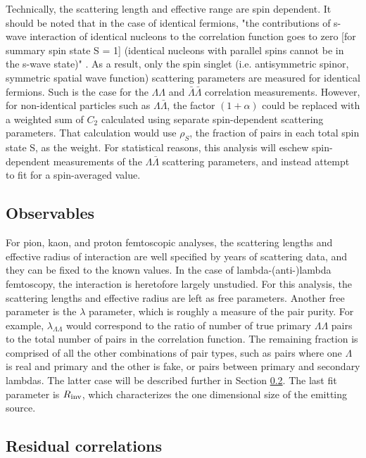 Technically, the scattering length and effective range are spin dependent.  It should be noted that in the case of identical fermions, "the contributions of s-wave interaction of identical nucleons to the correlation function goes to zero [for summary spin state S = 1] (identical nucleons with parallel spins cannot be in the s-wave state)" \cite{lednicky82}.  As a result, only the spin singlet (i.e. antisymmetric spinor, symmetric spatial wave function) scattering parameters are measured for identical fermions.  Such is the case for the $\Lambda\Lambda$ and $\bar{\Lambda}\bar{\Lambda}$ correlation measurements.  However, for non-identical particles such as $\Lambda\bar{\Lambda}$, the factor $(1+\alpha)$ could be replaced with a weighted sum of $C_2$ calculated using separate spin-dependent scattering parameters.  That calculation would use $\rho_S$, the fraction of pairs in each total spin state S, as the weight.  For statistical reasons, this analysis will eschew spin-dependent measurements of the $\Lambda\bar{\Lambda}$ scattering parameters, and instead attempt to fit for a spin-averaged value.


\subsection{Observables}
\label{sec:Observables}
For pion, kaon, and proton femtoscopic analyses, the scattering lengths and effective radius of interaction are well specified by years of scattering data, and they can be fixed to the known values.  In the case of lambda-(anti-)lambda femtoscopy, the interaction is heretofore largely unstudied.  For this analysis, the scattering lengths and effective radius are left as free parameters.  Another free parameter is the $\lambda$ parameter, which is roughly a measure of the pair purity.  For example, $\lambda_{\Lambda\Lambda}$ would correspond to the ratio of number of true primary $\Lambda\Lambda$ pairs to the total number of pairs in the correlation function. The remaining fraction is comprised of all the other combinations of pair types, such as pairs where one $\Lambda$ is real and primary and the other is fake, or pairs between primary and secondary lambdas.  The latter case will be described further in Section \ref{sec:Residual}.  The last fit parameter is $R_{\rm inv}$, which characterizes the one dimensional size of the emitting source.  


\subsection{Residual correlations}
\label{sec:Residual}

